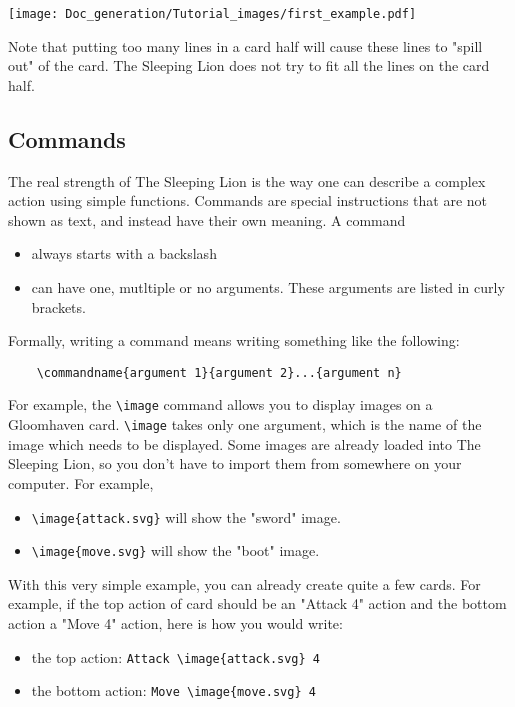 \documentclass{article}
\begin{document}
\begin{center}
\texttt{[image: Doc\_generation/Tutorial\_images/first\_example.pdf]}
\end{center}


Note that putting too many lines in a card half will cause these lines to "spill out" of the card. The Sleeping Lion does not try to fit all the lines on the card half.

\subsection{Commands}
The real strength of The Sleeping Lion is the way one can describe a complex action using simple functions. Commands are special instructions that are not shown as text, and instead have their own meaning. A command
\begin{itemize}
	\item always starts with a backslash
	\item can have one, mutltiple or no arguments. These arguments are listed in curly brackets.
\end{itemize}

Formally, writing a command means writing something like the following:
\begin{center}
\begin{BVerbatim}
	\commandname{argument 1}{argument 2}...{argument n}
\end{BVerbatim}
\end{center}



For example, the \verb#\image# command allows you to display images on a Gloomhaven card.
\verb#\image# takes only one argument, which is the name of the image which needs to be displayed. Some images are already loaded into The Sleeping Lion, so you don't have to import them from somewhere on your computer.
For example,
\begin{itemize}
	\item \verb#\image{attack.svg}# will show the "sword" image.
	\item \verb#\image{move.svg}# will show the "boot" image.
\end{itemize}

With this very simple example, you can already create quite a few cards. For example, if the top action of card should be an "Attack 4" action and the bottom action a "Move 4" action, here is how you would write:
\begin{itemize}
	\item the top action: \verb#Attack \image{attack.svg} 4#
	\item the bottom action: \verb#Move \image{move.svg} 4#
\end{itemize}
\end{document}
